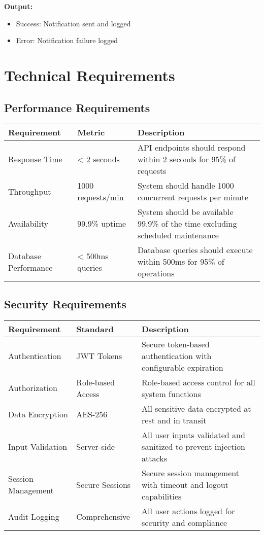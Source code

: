 \documentclass[12pt,a4paper]{article}
\begin{document}
\textbf{Output:}
\begin{itemize}
    \item Success: Notification sent and logged
    \item Error: Notification failure logged
\end{itemize}

\section{Technical Requirements}

\subsection{Performance Requirements}

\begin{longtable}{|p{2cm}|p{3cm}|p{9cm}|}
\hline
\textbf{Requirement} & \textbf{Metric} & \textbf{Description} \\
\hline
Response Time & < 2 seconds & API endpoints should respond within 2 seconds for 95\% of requests \\
\hline
Throughput & 1000 requests/min & System should handle 1000 concurrent requests per minute \\
\hline
Availability & 99.9\% uptime & System should be available 99.9\% of the time excluding scheduled maintenance \\
\hline
Database Performance & < 500ms queries & Database queries should execute within 500ms for 95\% of operations \\
\hline
\end{longtable}

\subsection{Security Requirements}

\begin{longtable}{|p{2cm}|p{3cm}|p{9cm}|}
\hline
\textbf{Requirement} & \textbf{Standard} & \textbf{Description} \\
\hline
Authentication & JWT Tokens & Secure token-based authentication with configurable expiration \\
\hline
Authorization & Role-based Access & Role-based access control for all system functions \\
\hline
Data Encryption & AES-256 & All sensitive data encrypted at rest and in transit \\
\hline
Input Validation & Server-side & All user inputs validated and sanitized to prevent injection attacks \\
\hline
Session Management & Secure Sessions & Secure session management with timeout and logout capabilities \\
\hline
Audit Logging & Comprehensive & All user actions logged for security and compliance \\
\hline
\end{longtable}
\end{document}
